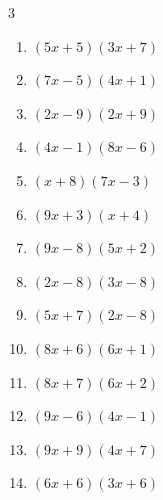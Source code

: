 \begin{multicols}{3}
\begin{enumerate}

  \item $(5x+5)(3x+7)$


  \item $(7x-5)(4x+1)$


\columnbreak %

  \item $(2x-9)(2x+9)$


  \item $(4x-1)(8x-6)$


  \item $(x+8)(7x-3)$


  \item $(9x+3)(x+4)$


  \item $(9x-8)(5x+2)$


  \item $(2x-8)(3x-8)$


  \item $(5x+7)(2x-8)$


  \item $(8x+6)(6x+1)$


  \item $(8x+7)(6x+2)$


  \item $(9x-6)(4x-1)$


  \item $(9x+9)(4x+7)$


  \item $(6x+6)(3x+6)$



\end{enumerate}
\end{multicols}
